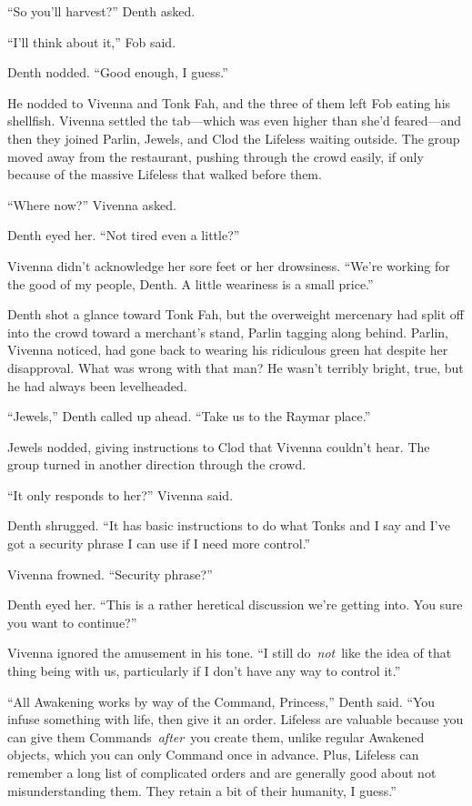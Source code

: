 “So you’ll harvest?” Denth asked.

“I’ll think about it,” Fob said.

Denth nodded. “Good enough, I guess.”

He nodded to Vivenna and Tonk Fah, and the three of them left Fob eating his shellfish. Vivenna settled the tab—which was even higher than she’d feared—and then they joined Parlin, Jewels, and Clod the Lifeless waiting outside. The group moved away from the restaurant, pushing through the crowd easily, if only because of the massive Lifeless that walked before them.

“Where now?” Vivenna asked.

Denth eyed her. “Not tired even a little?”

Vivenna didn’t acknowledge her sore feet or her drowsiness. “We’re working for the good of my people, Denth. A little weariness is a small price.”

Denth shot a glance toward Tonk Fah, but the overweight mercenary had split off into the crowd toward a merchant’s stand, Parlin tagging along behind. Parlin, Vivenna noticed, had gone back to wearing his ridiculous green hat despite her disapproval. What was wrong with that man? He wasn’t terribly bright, true, but he had always been levelheaded.

“Jewels,” Denth called up ahead. “Take us to the Raymar place.”

Jewels nodded, giving instructions to Clod that Vivenna couldn’t hear. The group turned in another direction through the crowd.

“It only responds to her?” Vivenna said.

Denth shrugged. “It has basic instructions to do what Tonks and I say and I’ve got a security phrase I can use if I need more control.”

Vivenna frowned. “Security phrase?”

Denth eyed her. “This is a rather heretical discussion we’re getting into. You sure you want to continue?”

Vivenna ignored the amusement in his tone. “I still do~\textit{not}~like the idea of that thing being with us, particularly if I don’t have any way to control it.”

“All Awakening works by way of the Command, Princess,” Denth said. “You infuse something with life, then give it an order. Lifeless are valuable because you can give them Commands~\textit{after}~you create them, unlike regular Awakened objects, which you can only Command once in advance. Plus, Lifeless can remember a long list of complicated orders and are generally good about not misunderstanding them. They retain a bit of their humanity, I guess.”

